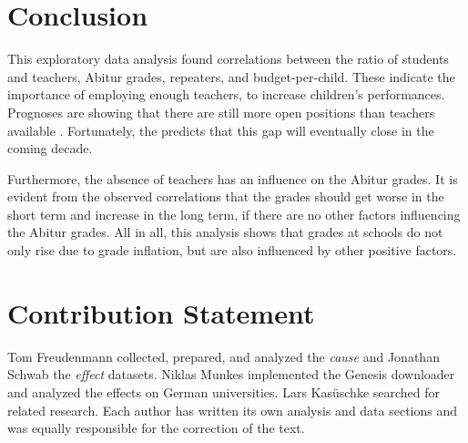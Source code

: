 \section{Conclusion}
This exploratory data analysis found correlations between the ratio of students and teachers, Abitur grades, repeaters, and budget-per-child. These indicate the importance of employing enough teachers, to increase children's performances. Prognoses are  showing that there are still more open positions than teachers available \cite{kultusminister_konferenz_lehrkrafteeinstellungsbedarf_2023}. Fortunately, the \citeauthor{kultusminister_konferenz_lehrkrafteeinstellungsbedarf_2023} predicts that this gap will eventually close in the coming decade.

Furthermore, the absence of teachers has an influence on the Abitur grades. It is evident from the observed correlations that the grades should get worse in the short term and increase in the long term, if there are no other factors influencing the Abitur grades. All in all, this analysis shows that grades at schools do not only rise due to grade inflation, but are also influenced by other positive factors.

\section*{Contribution Statement}
Tom Freudenmann collected, prepared, and analyzed the \emph{cause}  and Jonathan Schwab the \emph{effect} datasets. Niklas Munkes implemented the Genesis downloader and analyzed the effects on German universities. Lars Kasüschke searched for related research. Each author has written its own analysis and data sections and was equally responsible for the correction of the text.




